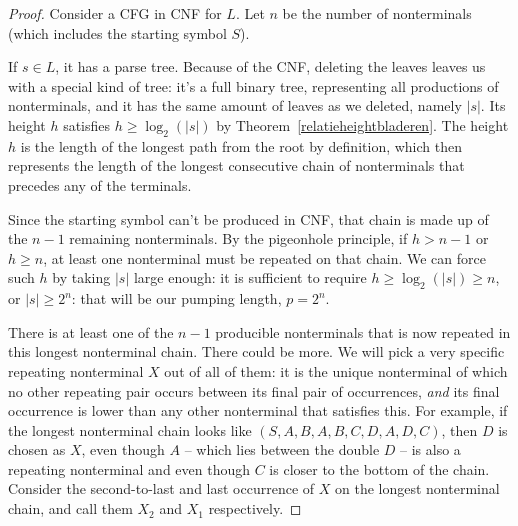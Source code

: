 \begin{proof}
Consider a CFG in CNF for $L$. Let $n$ be the number of nonterminals (which includes the starting symbol $S$).

If $s \in L$, it has a parse tree. Because of the CNF, deleting the leaves leaves us with a special kind of tree: it's a full binary tree, representing all productions of nonterminals, and it has the same amount of leaves as we deleted, namely $|s|$. Its height $h$ satisfies $h\geq \log_2(|s|)$ by Theorem~\ref{relatieheightbladeren}. The height $h$ is the length of the longest path from the root by definition, which then represents the length of the longest consecutive chain of nonterminals that precedes any of the terminals.

\medskip
Since the starting symbol can't be produced in CNF, that chain is made up of the $n-1$ remaining nonterminals. By the pigeonhole principle, if $h > n-1$ or $h \geq n$, at least one nonterminal must be repeated on that chain. We can force such $h$ by taking $|s|$ large enough: it is sufficient to require $h\geq \log_2(|s|) \geq n$, or $|s| \geq 2^n$: that will be our pumping length, $p = 2^n$.

\medskip
There is at least one of the $n-1$ producible nonterminals that is now repeated in this longest nonterminal chain. There could be more. We will pick a very specific repeating nonterminal $X$ out of all of them: it is the unique nonterminal of which no other repeating pair occurs between its final pair of occurrences, \emph{and} its final occurrence is lower than any other nonterminal that satisfies this. For example, if the longest nonterminal chain looks like $(S,A,B,A,B,C,D,A,D,C)$, then $D$ is chosen as $X$, even though $A$ -- which lies between the double $D$ -- is also a repeating nonterminal and even though $C$ is closer to the bottom of the chain. Consider the second-to-last and last occurrence of $X$ on the longest nonterminal chain, and call them $X_2$ and $X_1$ respectively.


\end{proof}
